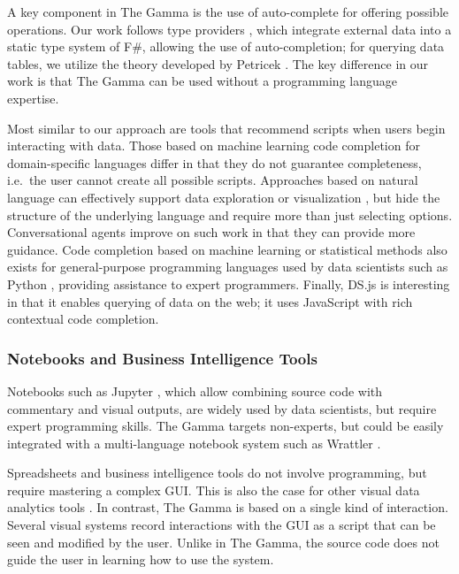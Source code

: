 \documentclass[manuscript,review,anonymous]{acmart}
\begin{document}
A key component in The Gamma is the use of auto-complete for offering possible operations.
Our work follows type providers \cite{inforich,fsdata}, which integrate external data into a
static type system of F\#, allowing the use of auto-completion; for querying data tables, we utilize
the theory developed by Petricek \cite{dotdriven}. The key difference in our work is that The Gamma
can be used without a programming language expertise.

Most similar to our approach are tools that recommend scripts when users begin interacting
with data. Those based on machine learning code completion for domain-specific languages \cite{predictive,proactive}
differ in that they do not guarantee completeness, i.e.~the user cannot create all possible
scripts. Approaches based on natural language can effectively support data exploration
or visualization \cite{eviza,codemend}, but hide the structure of the underlying language and
require more than just selecting options. Conversational agents \cite{iris} improve on such work
in that they can provide more guidance. Code completion based on machine learning or statistical
methods \cite{mlcomplete,statcomplete} also exists for general-purpose programming languages used
by data scientists such as Python \cite{pythia}, providing assistance to expert programmers.
Finally, DS.js \cite{dsjs} is interesting in that it enables querying of data on the
web; it uses JavaScript with rich contextual code completion.

\subsubsection*{Notebooks and Business Intelligence Tools}

Notebooks such as Jupyter \cite{jupyter}, which allow combining source code with commentary and
visual outputs, are widely used by data scientists, but require expert programming skills.
The Gamma targets non-experts, but could be easily integrated with a multi-language notebook system
such as Wrattler \cite{wrattler}.

Spreadsheets and business intelligence tools \cite{tableau,powerbi} do
not involve programming, but require mastering a complex GUI. This is also the case
for other visual data analytics tools \cite{control,vizdom}. In contrast, The Gamma is
based on a single kind of interaction. Several visual systems \cite{potter,wrangler,lyra} record
interactions with the GUI as a script that can be seen and modified by the user.
Unlike in The Gamma, the source code does not guide the user in learning how to use the system.
\end{document}
